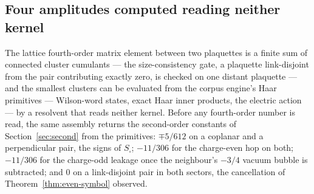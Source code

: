 \documentclass[11pt]{article}
\theoremstyle{plain}
\theoremstyle{definition}
\theoremstyle{remark}
\newcommand{\chk}[1]{}
\begin{document}
\subsection{Four amplitudes computed reading neither kernel}\label{sec:outside}

The lattice fourth-order matrix element between two plaquettes is a finite
sum of connected cluster cumulants --- the size-consistency gate, a plaquette
link-disjoint from the pair contributing exactly zero, is checked on one
distant plaquette --- and the smallest clusters can be evaluated
from the corpus engine's Haar primitives --- Wilson-word states, exact Haar
inner products, the electric action --- by a resolvent that reads neither
kernel. Before any fourth-order number is read, the same assembly returns the
second-order constants of Section~\ref{sec:second} from the primitives:
$\mp5/612$ on a coplanar and a perpendicular pair, the signs of $S_\square$;
$-11/306$ for the charge-even hop on both; $-11/306$ for the charge-odd
leakage once the neighbour's $-3/4$ vacuum bubble is subtracted; and $0$ on a
link-disjoint pair in both sectors, the cancellation of
Theorem~\ref{thm:even-symbol} observed.
\chk{the engine's primitives plus textbook second-order theory return t\_3 S\_sq, the C-even hop and the leakage}
\end{document}
